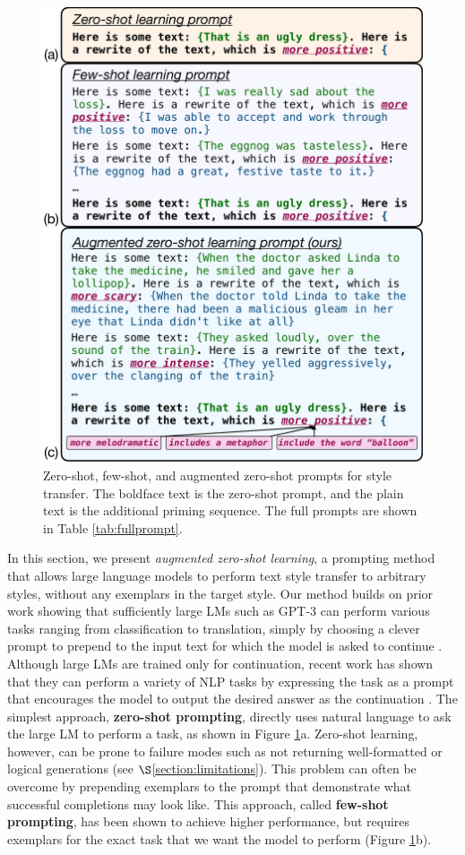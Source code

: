 \begin{figure}[tbp]
    \centering
     \includegraphics[width=0.5\linewidth]{figures/style-transfer-prompt.pdf}
  \caption{Zero-shot, few-shot, and augmented zero-shot prompts for style transfer. The boldface text is the zero-shot prompt, and the plain text is the additional priming sequence. The full prompts are shown in Table \ref{tab:fullprompt}.}
  \label{prompts}
\end{figure}


In this section, we present \textit{augmented zero-shot learning}, a prompting method that allows large language models to perform text style transfer to arbitrary styles, without any exemplars in the target style.
Our method builds on prior work showing that sufficiently large LMs such as GPT-3 can perform various tasks ranging from classification to translation, simply by choosing a clever prompt to prepend to the input text for which the model is asked to continue \citep{DBLP:journals/corr/abs-2005-14165,branwen2020gpt}. 
Although large LMs are trained only for continuation, recent work has shown that they can perform a variety of NLP tasks by expressing the task as a prompt that encourages the model to output the desired answer as the continuation \citep{liu2021pre,puri2019zero,weller-etal-2020-learning,DBLP:journals/corr/abs-2005-14165,schick-schutze-2021-just}. 
The simplest approach, \textbf{zero-shot prompting}, directly uses natural language to ask the large LM to perform a task, as shown in Figure \ref{prompts}a.
Zero-shot learning, however, can be prone to failure modes such as not returning well-formatted or logical generations (see $\S$\ref{section:limitations}).
This problem can often be overcome by prepending exemplars to the prompt that demonstrate what successful completions may look like.
This approach, called \textbf{few-shot prompting}, has been shown to achieve higher performance, but requires exemplars for the exact task that we want the model to perform (Figure \ref{prompts}b).

